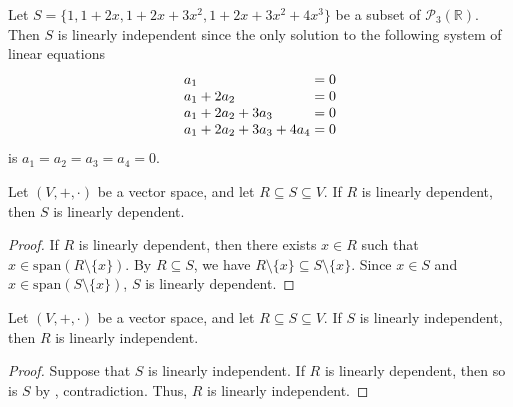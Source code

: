 \begin{example}
  Let $S = \{1, 1+2x, 1+2x+3x^2, 1+2x+3x^2+4x^3\}$ be a subset of
  $\mathcal{P}_3(\mathbb{R})$.
  Then $S$ is linearly independent since the only solution to the
  following system of linear equations
  \begin{equation*}
    \setlength\arraycolsep{0pt}
    \begin{array}{r>{{}}c<{{}}r>{{}}c<{{}}r>{{}}c<{{}}r@{{}={}}r}
      a_1 & &      & &      & &      & 0 \\
      a_1 &+& 2a_2 & &      & &      & 0 \\
      a_1 &+& 2a_2 &+& 3a_3 & &      & 0 \\
      a_1 &+& 2a_2 &+& 3a_3 &+& 4a_4 & 0 \\
    \end{array}
  \end{equation*}
  is $a_1 = a_2 = a_3 = a_4 = 0$.
\end{example}

\begin{theorem}\label{thm:linear-independence-implication}
  Let $(V, +, \cdot)$ be a vector space, and let $R \subseteq S \subseteq V$.
  If $R$ is linearly dependent, then $S$ is linearly dependent.
\end{theorem}
\begin{proof}
  If $R$ is linearly dependent, then there exists $x \in R$ such that
  $x \in \mathrm{span}(R \setminus \{x\})$.
  By $R \subseteq S$, we have
  $R \setminus \{x\} \subseteq S \setminus \{x\}$.
  Since $x \in S$ and $x \in \mathrm{span}(S \setminus \{x\})$, $S$ is
  linearly dependent.
\end{proof}

\begin{corollary}
  Let $(V, +, \cdot)$ be a vector space, and let $R \subseteq S \subseteq V$.
  If $S$ is linearly independent, then $R$ is linearly independent.
\end{corollary}
\begin{proof}
  Suppose that $S$ is linearly independent.
  If $R$ is linearly dependent, then so is $S$ by
  , contradiction.
  Thus, $R$ is linearly independent.
\end{proof}

